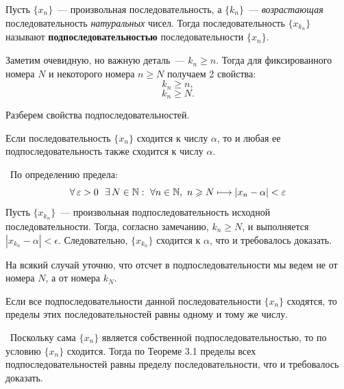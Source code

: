 

\begin{definition}
Пусть \(\{x_{n}\}\)~--- произвольная последовательность,
а \(\{k_{n}\}\)~--- \textit{возрастающая} последовательность \textit{натуральных} чисел.
Тогда последовательность \(\{x_{k_{n}}\}\) называют \textbf{подпоследовательностью}
последовательности \(\{x_{n}\}\).
\end{definition}

\begin{note}
Заметим очевидную, но важную деталь~--- \(k_{n}\geq n\).
Тогда для фиксированного номера \(N\) и некоторого номера \(n\geq N\)
получаем 2 свойства:
\[
k_{n} \geq n,
\]
\[
k_{n} \geq N.
\]
\end{note}

\vspace{5mm}

Разберем свойства подпоследовательностей.

\begin{theorem}
Если последовательность \(\{x_{n}\}\) сходится к числу \(\alpha\),
то и любая ее подпоследовательность также сходится к числу \(\alpha\).

 \vspace{2mm}

\proofname~По определению предела:
\[
\forall \, \varepsilon > 0 ~~ \exists \, N \in \mathbb{N}:
~ \forall n \in \mathbb{N}, ~ n \geqslant N \longmapsto |x_{n} - \alpha| < \varepsilon
\]
Пусть \(\{x_{k_{n}}\}\)~--- произвольная подпоследовательность исходной последовательности.
Тогда, согласно замечанию, \(k_{n} \geq N\), и выполняется \(|x_{k_{n}} - \alpha| < \epsilon\).
Следовательно, \(\{x_{k_{n}}\}\) сходится к \(\alpha\), что и требовалось доказать.~\qedsymbol

\begin{anote}
На всякий случай уточню, что отсчет в подпоследовательности мы ведем
не от номера \(N\), а от номера \(k_{N}\).
\end{anote}

\end{theorem}

\begin{theorem}
Если все подпоследовательности данной последовательности \(\{x_{n}\}\) сходятся,
то пределы этих последовательностей равны одному и тому же числу.

\vspace{2mm}

\proofname~Поскольку сама \(\{x_{n}\}\) является собственной подпоследовательностью,
то по условию \(\{x_{n}\}\) сходится. Тогда по Теореме 3.1 пределы всех 
подпоследовательностей равны пределу последовательности, что и требовалось доказать.~\qedsymbol
\end{theorem}

